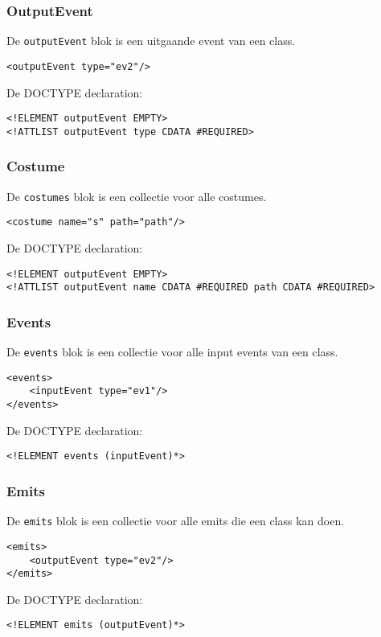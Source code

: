 \documentclass[]{article}
\begin{document}
\subsubsection{OutputEvent}
De \texttt{outputEvent} blok is een uitgaande event van een class.
\lstset{language=XML}
\begin{lstlisting}
<outputEvent type="ev2"/>
\end{lstlisting}
De DOCTYPE declaration: 
\lstset{language=XML}
\begin{lstlisting}
<!ELEMENT outputEvent EMPTY>
<!ATTLIST outputEvent type CDATA #REQUIRED>
\end{lstlisting}

\subsubsection{Costume}
De \texttt{costumes} blok is een collectie voor alle costumes.
\lstset{language=XML}
\begin{lstlisting}
<costume name="s" path="path"/>
\end{lstlisting}
De DOCTYPE declaration: 
\lstset{language=XML}
\begin{lstlisting}
<!ELEMENT outputEvent EMPTY>
<!ATTLIST outputEvent name CDATA #REQUIRED path CDATA #REQUIRED>
\end{lstlisting}


\subsubsection{Events}
De \texttt{events} blok is een collectie voor alle input events van een class.
\lstset{language=XML}
\begin{lstlisting}
<events>
	<inputEvent type="ev1"/>
</events>
\end{lstlisting}
De DOCTYPE declaration: 
\lstset{language=XML}
\begin{lstlisting}
<!ELEMENT events (inputEvent)*>
\end{lstlisting}

\subsubsection{Emits}
De \texttt{emits} blok is een collectie voor alle emits die een class kan doen.
\lstset{language=XML}
\begin{lstlisting}
<emits>
	<outputEvent type="ev2"/>
</emits>
\end{lstlisting}
De DOCTYPE declaration: 
\lstset{language=XML}
\begin{lstlisting}
<!ELEMENT emits (outputEvent)*>
\end{lstlisting}
\end{document}
